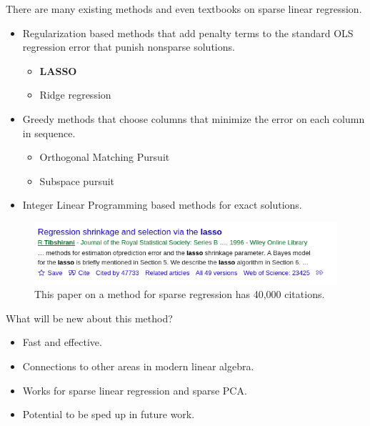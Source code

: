 \documentclass{beamer}
\begin{document}
\begin{frame}
    There are many existing methods and even textbooks on sparse linear regression.
    \begin{itemize}
        \item Regularization based methods that add penalty terms to the standard OLS regression error that punish nonsparse solutions.
            \begin{itemize}
                \item \textbf{LASSO}
                \item Ridge regression
            \end{itemize}
        \item Greedy methods that choose columns that minimize the error on each column in sequence.
            \begin{itemize}
                \item Orthogonal Matching Pursuit
                \item Subspace pursuit
            \end{itemize}
        \item Integer Linear Programming based methods for exact solutions.
    \end{itemize}

    \pause
    \begin{figure}[h]
        \centering
        \includegraphics[width=0.8\linewidth]{lasso_citations}
        \caption{This paper on a method for sparse regression has 40,000 citations.}%
    \end{figure}
\end{frame}
\begin{frame}
    What will be new about this method?
    \begin{itemize}
        \item Fast and effective.
        \item Connections to other areas in modern linear algebra.
        \item Works for sparse linear regression and sparse PCA.
        \item Potential to be sped up in future work.
    \end{itemize}
\end{frame}
\end{document}
